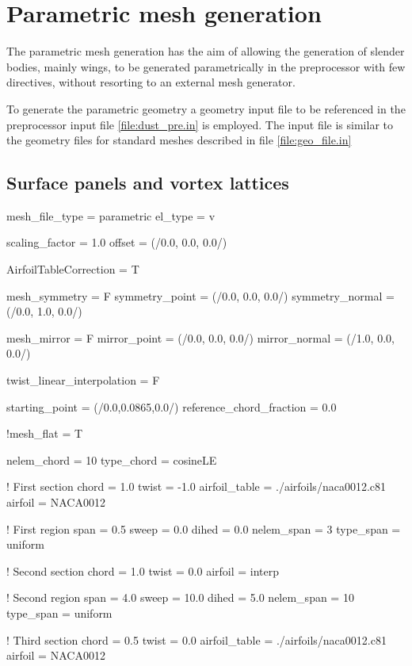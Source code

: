 \section{Parametric mesh generation}
\label{sec:Parametric_mesh_generation}

The parametric mesh generation has the aim of allowing the generation of slender bodies, mainly wings, to be generated parametrically in the preprocessor with few directives, without resorting to an external mesh generator. 

To generate the parametric geometry a geometry input file to be referenced in the preprocessor input file \ref{file:dust_pre.in} is employed. The input file is similar to the geometry files for standard meshes described in file \ref{file:geo_file.in}


\subsection{Surface panels and vortex lattices}

\begin{inputfile}[frame=single, caption={paramtetric\_geo\_file.in}, label={file:parametric_geo_file.in}]
mesh_file_type = parametric
el_type = v

scaling_factor = 1.0
offset = (/0.0, 0.0, 0.0/)

AirfoilTableCorrection = T

mesh_symmetry = F
symmetry_point  = (/0.0, 0.0, 0.0/)
symmetry_normal = (/0.0, 1.0, 0.0/)

mesh_mirror = F
mirror_point  = (/0.0, 0.0, 0.0/)
mirror_normal = (/1.0, 0.0, 0.0/)

twist_linear_interpolation = F

starting_point = (/0.0,0.0865,0.0/)
reference_chord_fraction = 0.0

!mesh_flat = T

nelem_chord = 10
type_chord = cosineLE

! First section
chord = 1.0
twist = -1.0
airfoil_table = ./airfoils/naca0012.c81
airfoil = NACA0012

! First region
span = 0.5
sweep = 0.0
dihed = 0.0
nelem_span = 3 
type_span = uniform

! Second section
chord = 1.0
twist = 0.0
airfoil = interp

! Second region
span = 4.0
sweep = 10.0
dihed = 5.0
nelem_span = 10 
type_span = uniform

! Third section
chord = 0.5
twist =  0.0
airfoil_table = ./airfoils/naca0012.c81
airfoil = NACA0012

\end{inputfile}

